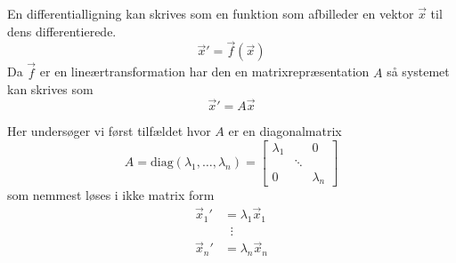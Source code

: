 %
%

En differentialligning kan skrives som en funktion som afbilleder en vektor
$\vec{x}$ til dens differentierede.
\[
	\vec{x}'=\vec{f}(\vec{x})
\]
Da $\vec{f}$ er en lineærtransformation har den en matrixrepræsentation $A$ så 
systemet kan skrives som
\[
	\vec{x}'=A \vec{x}
\]

Her undersøger vi først tilfældet hvor $A$ er en diagonalmatrix
\[
	A = \text{diag}(\lambda_1, \dotsc, \lambda_n) =  \begin{bmatrix}
		\lambda_1 &        & 0 \\
		          & \ddots & \\
		0         &        & \lambda_n
	\end{bmatrix}
\]
som nemmest løses i ikke matrix form
\begin{align*}
	\vec{x}_1' &= \lambda_1 \vec{x}_1 \\
		& \; \; \vdots \\
	\vec{x}_n' &= \lambda_n \vec{x}_n
\end{align*}
